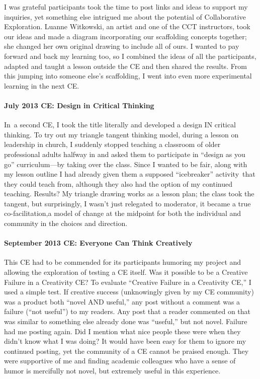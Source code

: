 I was grateful participants took the time to post links and ideas to
support my inquiries, yet something else intrigued me about the
potential of Collaborative Exploration. Luanne Witkowski, an artist and
one of the CCT instructors, took our ideas and made a diagram
incorporating our scaffolding concepts together; she changed her own
original drawing to include all of ours. I wanted to pay forward and
back my learning too, so I combined the ideas of all the participants,
adapted and taught a lesson outside the CE and then shared the results.
From this jumping into someone else's scaffolding, I went into even more
experimental learning in the next CE.

\paragraph{July 2013 CE: Design in Critical
Thinking}\label{july-2013-ce-design-in-critical-thinking}

In~a second CE, I took the title literally and developed a design IN
critical thinking. To try out my triangle tangent thinking model, during
a lesson on leadership in church, I suddenly stopped teaching a
classroom of older professional adults halfway in and asked them to
participate in ``design as you go'' curriculum---by taking over the
class. Since I wanted to be fair, along with my lesson outline I had
already given them a supposed ``icebreaker'' activity~that they could
teach from, although they also had the option of my continued teaching.
Results? My triangle drawing works as a lesson plan; the class took the
tangent, but surprisingly, I wasn't just relegated to moderator, it
became a true co-facilitation,a model of change at the midpoint for both
the individual and community in the choices and direction.

\paragraph{September 2013 CE: Everyone Can Think
Creatively}\label{september-2013-ce-everyone-can-think-creatively}

This CE had to be commended for its participants humoring my project and
allowing the exploration of testing a CE itself. Was it possible to be a
Creative Failure in a Creativity CE? To evaluate ``Creative Failure in a
Creativity CE,'' I used a simple test. If creative success (unknowingly
given by my CE community) was a product both ``novel AND useful,'' any
post without a comment was a failure (``not useful'') to my readers. Any
post that a reader commented on that was similar to something else
already done was ``useful,'' but not novel. Failure had me posting
again. Did I mention what nice people these were when they didn't know
what I was doing? It would have been easy for them to ignore my
continued posting, yet the community of a CE cannot be praised enough.
They were supportive of me and finding academic colleagues who have a
sense of humor is mercifully not novel, but extremely useful in this
experience.

